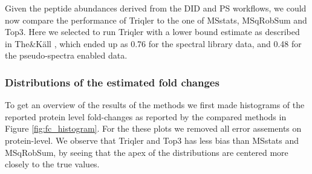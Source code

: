 \documentclass[10pt,letterpaper]{article}
\begin{document}
Given the peptide abundances derived from the DID and PS workflows, we could now compare the performance of Triqler to the one of MSstats, MSqRobSum and Top3. Here we selected to run Triqler with a lower bound estimate as described in The\&K\"{a}ll \cite{the2021triqler}, which ended up as 0.76 for the spectral library data, and 0.48 for the pseudo-spectra enabled data.

\subsubsection*{Distributions of the estimated fold changes}

To get an overview of the results of the methods we first made histograms of the reported protein level fold-changes as reported by the compared methods in Figure \ref{fig:fc_histogram}. For the these plots we removed all error assements on protein-level. We observe that Triqler and Top3 has less bias than MSstats and MSqRobSum, by seeing that the apex of the distributions are centered more closely to the true values.  %
\end{document}
